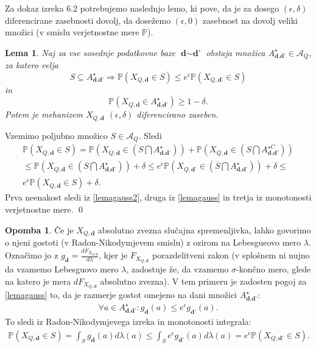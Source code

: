 \documentclass[12pt,a4paper]{amsart}
\theoremstyle{definition} %
\newtheorem{opomba}[definicija]{Opomba}
\theoremstyle{plain} %
\newtheorem{lema}[definicija]{Lema}
\begin{document}
Za dokaz izreka 6.2 potrebujemo naslednjo lemo, ki pove, da je za dosego $(\epsilon, \delta)$ diferencirane zasebnosti dovolj, da dosežemo $(\epsilon, 0)$ zasebnost na dovolj veliki množici (v smislu verjetnostne mere $\mathbb{P}$).
\begin{lema}
Naj za vse sosednje podatkovne baze $\textbf{d} \sim \textbf{d'}$ obstaja množica $A_{\textbf{d}, \textbf{d'}}^{\star} \in \mathcal{A}_Q$, za katero velja
\begin{equation}\label{lemagauss}
S \subseteq A_{\textbf{d}, \textbf{d'}}^{\star} \Rightarrow \mathbb{P}(X_{Q, \textbf{d}} \in S) \leq e^{\epsilon} \mathbb{P}(X_{Q, \textbf{d'}} \in S) \tag{8}
\end{equation}
in 
\begin{equation}\label{lemagauss2}
\mathbb{P}(X_{Q, \textbf{d}} \in A_{\textbf{d}, \textbf{d'}}^{\star}) \geq 1 - \delta. \tag{9}
\end{equation}
Potem je mehanizem $X_{Q, \textbf{d}}$ $(\epsilon, \delta)$ diferencirano zaseben.
\end{lema}
\proof 
Vzemimo poljubno množico $S \in \mathcal{A}_Q$. Sledi
\begin{gather*}
\mathbb{P}(X_{Q, \textbf{d}} \in S)  = \mathbb{P}(X_{Q, \textbf{d}} \in (S \bigcap A_{\textbf{d}, \textbf{d'}}^{\star}) )  + \mathbb{P}(X_{Q, \textbf{d}} \in ( S \bigcap A_{\textbf{d}, \textbf{d'}}^{\star C} ) ) \\ \leq \mathbb{P}(X_{Q, \textbf{d}} \in (S \bigcap A_{\textbf{d}, \textbf{d'}}^{\star}) )  + \delta \leq e^{\epsilon} \mathbb{P}(X_{Q, \textbf{d'}} \in (S \bigcap A_{\textbf{d}, \textbf{d'}}^{\star}) )  + \delta \leq \\ e^{\epsilon} \mathbb{P}(X_{Q, \textbf{d}} \in S )  + \delta.
\end{gather*}
Prva neenakost sledi iz \eqref{lemagauss2}, druga iz \eqref{lemagauss} in tretja iz monotonosti verjetnostne mere.
\qed
\newline
\begin{opomba}
Če je $X_{Q, \textbf{d}}$ absolutno zvezna slučajna spremenljivka, lahko govorimo o njeni gostoti (v Radon-Nikodymjevem smislu) z ozirom na Lebesgueovo mero $\lambda$. Označimo jo z $g_{\textbf{d}} = \frac{dF_{X_{Q, \textbf{d}}}}{d \lambda}$, kjer je $F_{X_{Q, \textbf{d}}}$ porazdelitveni zakon (v splošnem ni nujno da vzamemo Lebesguovo mero $\lambda$, zadostuje že, da vzamemo $\sigma$-končno mero, glede na katero je mera $dF_{X_{Q, \textbf{d}}}$ absolutno zvezna). V tem primeru je zadosten pogoj za \eqref{lemagauss} to, da je razmerje gostot omejeno na dani množici $A_{\textbf{d}, \textbf{d'}}^{\star}$:
\begin{gather*}
\forall a \in A_{\textbf{d}, \textbf{d'}}^{\star} : g_{\textbf{d}} (a) \leq e^{\epsilon} g_{\textbf{d'}} (a).
\end{gather*}
To sledi iz Radon-Nikodymjevega izreka in monotonosti integrala:
\begin{gather*}
\mathbb{P}(X_{Q, \textbf{d}} \in S) = \int_{S} g_{\textbf{d}}(a) d\lambda(a) \leq \int_{S} e^{\epsilon} g_{\textbf{d'}}(a) d\lambda(a) = e^{\epsilon} \mathbb{P}(X_{Q, \textbf{d'}} \in S).
\end{gather*}
\end{opomba}
\end{document}
